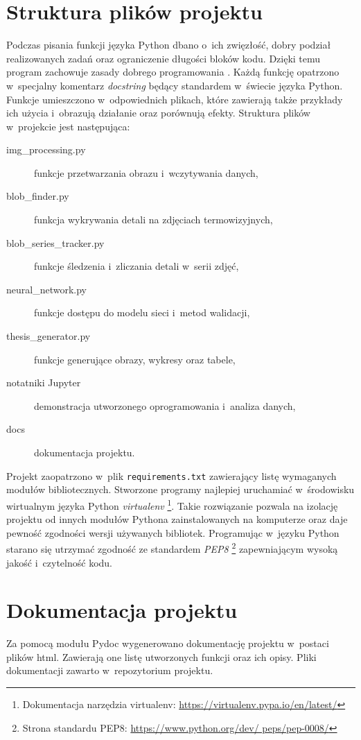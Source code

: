 \section{Struktura plików projektu}
Podczas pisania funkcji języka Python dbano o~ich zwięzłość, dobry podział
realizowanych zadań oraz ograniczenie długości bloków kodu.
Dzięki temu program zachowuje zasady dobrego programowania \cite{martin_code}.
Każdą funkcję opatrzono w~specjalny komentarz \emph{docstring} będący standardem
w~świecie języka Python.
Funkcje umieszczono w~odpowiednich plikach, które zawierają także przykłady ich
użycia i~obrazują działanie oraz porównują efekty.
Struktura plików w~projekcie jest następująca:
\begin{description}
    \item[img\_processing.py]
        funkcje przetwarzania obrazu i~wczytywania danych,
    \item[blob\_finder.py]
        funkcja wykrywania detali na zdjęciach termowizyjnych,
    \item[blob\_series\_tracker.py]
        funkcje śledzenia i~zliczania detali w~serii zdjęć,
    \item[neural\_network.py]
        funkcje dostępu do modelu sieci i~metod walidacji,
    \item[thesis\_generator.py]
        funkcje generujące obrazy, wykresy oraz tabele,
    \item[notatniki Jupyter]
        demonstracja utworzonego oprogramowania i~analiza danych,
    \item[docs] dokumentacja projektu.
\end{description}

Projekt zaopatrzono w~plik \texttt{requirements.txt} zawierający listę
wymaganych modułów bibliotecznych.
Stworzone programy najlepiej uruchamiać w~środowisku wirtualnym języka Python
\emph{virtualenv}%
\footnote{%
    Dokumentacja narzędzia virtualenv:
    \url{https://virtualenv.pypa.io/en/latest/}}.
Takie rozwiązanie pozwala na izolację projektu od innych modułów Pythona
zainstalowanych na komputerze oraz daje pewność zgodności wersji używanych
bibliotek.
Programując w~języku Python starano się utrzymać zgodność ze standardem
\emph{PEP8}%
\footnote{%
    Strona standardu PEP8: \url{https://www.python.org/dev/ peps/pep-0008/}}
zapewniającym wysoką jakość i~czytelność kodu.

\section{Dokumentacja projektu}
Za pomocą modułu Pydoc wygenerowano dokumentację projektu w~postaci plików
html.
Zawierają one listę utworzonych funkcji oraz ich opisy.
Pliki dokumentacji zawarto w~repozytorium projektu.

